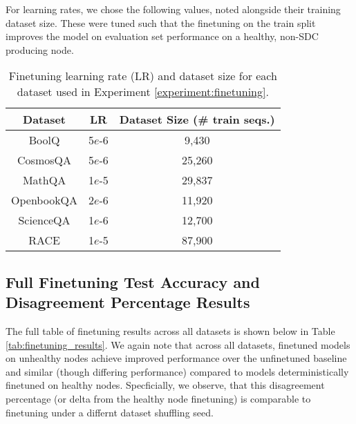 For learning rates, we chose the following values, noted alongside their training dataset size. These were tuned such that the finetuning on the train split improves the model on evaluation set performance on a healthy, non-SDC producing node.
\begin{table}[h]

\caption{Finetuning learning rate (LR) and dataset size for each dataset used in Experiment \ref{experiment:finetuning}.}
\vskip -0.15in

\begin{center}
\begin{small}
\begin{sc}
\setlength{\tabcolsep}{3pt}
\renewcommand{\arraystretch}{1.2} 
\begin{tabular}{ccc}
\hline
\toprule
Dataset & LR & Dataset Size (\# train seqs.) \\
\midrule
BoolQ & 5$e$-6 & 9,430 \\
CosmosQA & 5$e$-6 & 25,260 \\
MathQA & 1$e$-5 & 29,837 \\
OpenbookQA & 2$e$-6 & 11,920 \\
ScienceQA & 1$e$-6 & 12,700 \\
RACE & 1$e$-5 & 87,900 \\
\bottomrule
\end{tabular}

\end{sc}
\end{small}
\end{center}


\vskip -0.2in
\label{fig:finetuning_lr_data_size}

\end{table}

\subsection{Full Finetuning Test Accuracy and Disagreement Percentage Results} \label{appendix:full_finetuning_results}

The full table of finetuning results across all datasets is shown below in Table \ref{tab:finetuning_results}. We again note that across all datasets, finetuned models on unhealthy nodes achieve improved performance over the unfinetuned baseline and similar (though differing performance) compared to models deterministically finetuned on healthy nodes. Specficially, we observe, that this disagreement percentage (or delta from the healthy node finetuning) is comparable to finetuning under a differnt dataset shuffling seed.

